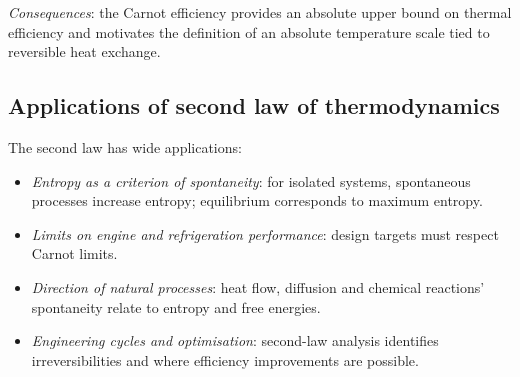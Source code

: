 		\textit{Consequences}: the Carnot efficiency provides an absolute upper bound on thermal efficiency and motivates the definition of an absolute temperature scale tied to reversible heat exchange.
		
	\subsection{Applications of second law of thermodynamics}
		The second law has wide applications:
		\begin{itemize}
			\item \textit{Entropy as a criterion of spontaneity}: for isolated systems, spontaneous processes increase entropy; equilibrium corresponds to maximum entropy.
			
			\item \textit{Limits on engine and refrigeration performance}: design targets must respect Carnot limits.
			
			\item \textit{Direction of natural processes}: heat flow, diffusion and chemical reactions' spontaneity relate to entropy and free energies.
			
			\item \textit{Engineering cycles and optimisation}: second-law analysis identifies irreversibilities and where efficiency improvements are possible.
		\end{itemize}